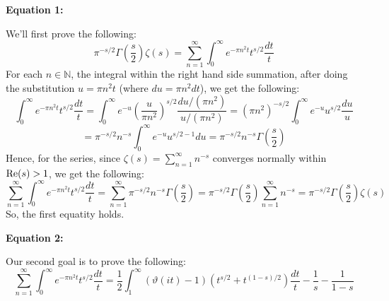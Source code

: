 \documentclass{article}
\begin{document}
\hfil

\textbf{Equation 1:}

We'll first prove the following:
$$\pi^{-s/2}\Gamma\left(\frac{s}{2}\right)\zeta(s)=\sum_{n=1}^{\infty}\int_{0}^{\infty}e^{-\pi n^2t}t^{s/2}\frac{dt}{t}$$
For each $n\in\mathbb{N}$, the integral within the right hand side summation, after doing the substitution $u = \pi n^2t$ (where $du=\pi n^2dt$), we get the following:
$$\int_{0}^{\infty}e^{-\pi n^2t}t^{s/2}\frac{dt}{t} = \int_{0}^{\infty}e^{-u}\left(\frac{u}{\pi n^2}\right)^{s/2}\frac{du/(\pi n^2)}{u/(\pi n^2)} = (\pi n^2)^{-s/2}\int_{0}^{\infty}e^{-u}u^{s/2}\frac{du}{u}$$
$$ = \pi^{-s/2}n^{-s}\int_{0}^{\infty}e^{-u}u^{s/2-1}du = \pi^{-s/2}n^{-s}\Gamma\left(\frac{s}{2}\right)$$
Hence, for the series, since $\zeta(s)=\sum_{n=1}^{\infty}n^{-s}$ converges normally within $\textmd{Re}(s)>1$, we get the following:
$$\sum_{n=1}^{\infty}\int_{0}^{\infty}e^{-\pi n^2t}t^{s/2}\frac{dt}{t} = \sum_{n=1}^{\infty}\pi^{-s/2}n^{-s}\Gamma\left(\frac{s}{2}\right) = \pi^{-s/2}\Gamma\left(\frac{s}{2}\right)\sum_{n=1}^{\infty}n^{-s} = \pi^{-s/2}\Gamma\left(\frac{s}{2}\right)\zeta(s)$$
So, the first equatity holds.

\hfil

\textbf{Equation 2:}

Our second goal is to prove the following:
$$\sum_{n=1}^{\infty}\int_{0}^{\infty}e^{-\pi n^2t}t^{s/2}\frac{dt}{t}=\frac{1}{2}\int_{1}^{\infty}(\vartheta(it)-1)(t^{s/2}+t^{(1-s)/2})\frac{dt}{t}-\frac{1}{s}-\frac{1}{1-s}$$
\end{document}
